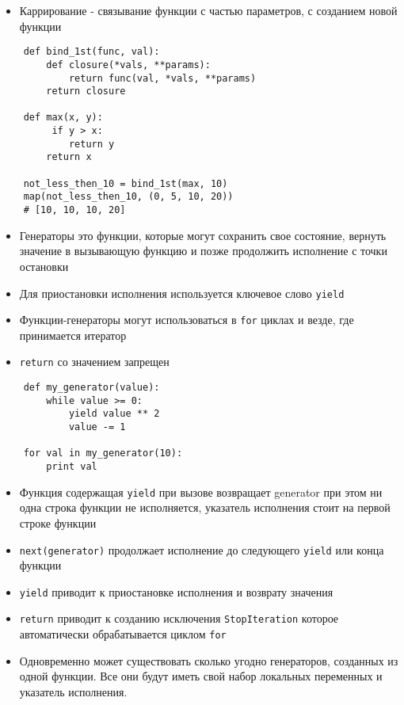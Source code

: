 \documentclass{article}
\begin{document}
\begin{itemize}
	\item Каррирование - связывание функции с частью параметров, с созданием новой функции
\end{itemize}
\vspace{15pt}
\begin{lstlisting}
	def bind_1st(func, val):
	    def closure(*vals, **params):
	        return func(val, *vals, **params)
	    return closure

	def max(x, y):
		 if y > x:
	        return y
	    return x

	not_less_then_10 = bind_1st(max, 10)
	map(not_less_then_10, (0, 5, 10, 20))
	# [10, 10, 10, 20]
\end{lstlisting}
\newpage

\begin{itemize}
	\item Генераторы это функции, которые могут сохранить свое состояние, вернуть 
		значение в вызывающую функцию и позже продолжить исполнение с точки остановки
	\item Для приостановки исполнения используется ключевое слово \lstinline!yield!
	\item Функции-генераторы могут использоваться в \LARGE\lstinline!for! циклах и везде, где
		принимается итератор
	\item \lstinline!return! со значением запрещен
\end{itemize}
\vspace{15pt}
\begin{lstlisting}
	def my_generator(value):
		while value >= 0:
			yield value ** 2
			value -= 1

	for val in my_generator(10):
		print val
\end{lstlisting}
\newpage

\begin{itemize}
	\item Функция содержащая \lstinline!yield! при вызове возвращает generator
		при этом ни одна строка функции не исполняется, указатель исполнения стоит 
		на первой строке функции
	\item \lstinline!next(generator)! продолжает исполнение до следующего 
		\lstinline!yield! или конца функции
	\item \lstinline!yield! приводит к приостановке исполнения и возврату значения
	\item \lstinline!return! приводит к созданию исключения \lstinline!StopIteration!
		которое автоматически обрабатывается циклом \lstinline!for!
	\item Одновременно может существовать сколько угодно генераторов, созданных из одной функции.
		Все они будут иметь свой набор локальных переменных и указатель исполнения.
\end{itemize}
\newpage
\end{document}
